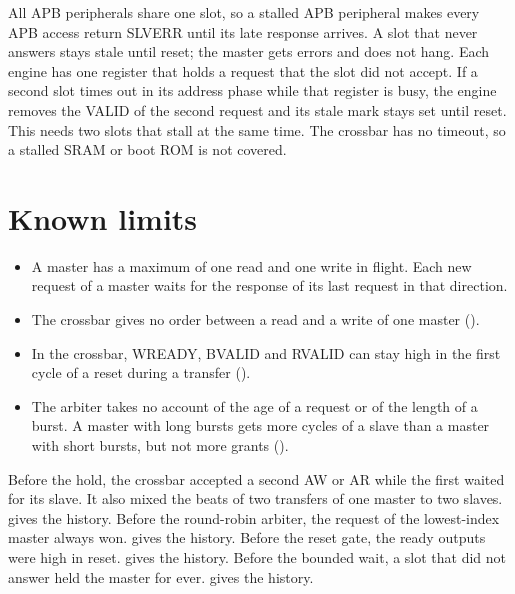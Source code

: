 \begin{information}
All APB peripherals share one slot, so a stalled APB peripheral makes every APB access return SLVERR until its late response arrives. A slot that never answers stays stale until reset; the master gets errors and does not hang. Each engine has one register that holds a request that the slot did not accept. If a second slot times out in its address phase while that register is busy, the engine removes the VALID of the second request and its stale mark stays set until reset. This needs two slots that stall at the same time. The crossbar has no timeout, so a stalled SRAM or boot ROM is not covered.
\end{information}

\section{Known limits}\label{ds:ch:mod-data-fabric:known-limits}
\begin{information}
\begin{itemize}
  \item A master has a maximum of one read and one write in flight. Each new request of a master waits for the response of its last request in that direction.
  \item The crossbar gives no order between a read and a write of one master ().
  \item In the crossbar, WREADY, BVALID and RVALID can stay high in the first cycle of a reset during a transfer ().
  \item The arbiter takes no account of the age of a request or of the length of a burst. A master with long bursts gets more cycles of a slave than a master with short bursts, but not more grants ().
\end{itemize}
Before the hold, the crossbar accepted a second AW or AR while the first waited for its slave. It also mixed the beats of two transfers of one master to two slaves.  gives the history.
Before the round-robin arbiter, the request of the lowest-index master always won.  gives the history.
Before the reset gate, the ready outputs were high in reset.  gives the history.
Before the bounded wait, a slot that did not answer held the master for ever.  gives the history.
\end{information}


